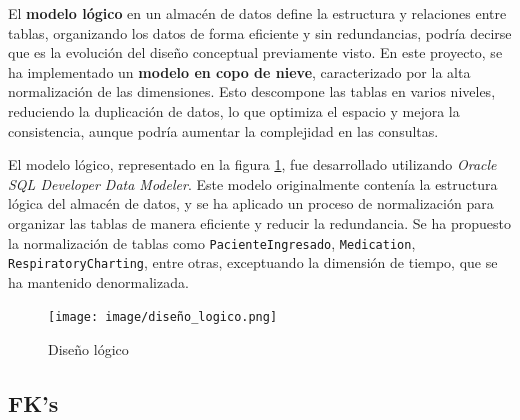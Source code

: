 \documentclass[12pt, a4paper, twoside]{article}
\begin{document}
	El \textbf{modelo lógico} en un almacén de datos define la estructura y relaciones entre tablas, organizando los datos de forma eficiente y sin redundancias, podría decirse que es la evolución del diseño conceptual previamente visto. En este proyecto, se ha implementado un \textbf{modelo en copo de nieve}, caracterizado por la alta normalización de las dimensiones. Esto descompone las tablas en varios niveles, reduciendo la duplicación de datos, lo que optimiza el espacio y mejora la consistencia, aunque podría aumentar la complejidad en las consultas.
	
	El modelo lógico, representado en la figura \ref{fig:11}, fue desarrollado utilizando \textit{Oracle SQL Developer Data Modeler}. Este modelo originalmente contenía la estructura lógica del almacén de datos, y se ha aplicado un proceso de normalización para organizar las tablas de manera eficiente y reducir la redundancia. Se ha propuesto la normalización de tablas como \texttt{PacienteIngresado}, \texttt{Medication}, \texttt{RespiratoryCharting}, entre otras, exceptuando la dimensión de tiempo, que se ha mantenido denormalizada.
	
	
	\begin{figure}[h!]
		\centering
		\texttt{[image: image/diseño\_logico.png]}
		\caption{Diseño lógico}
		\label{fig:11}
	\end{figure}
	

	
	\subsection{FK's}
	
\end{document}
